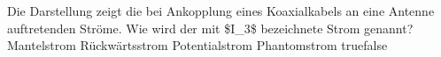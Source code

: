     {Die Darstellung zeigt die bei Ankopplung eines Koaxialkabels an eine Antenne auftretenden Ströme. Wie wird der mit \$I\_3\$ bezeichnete Strom genannt?}
    {Mantelstrom}
    {Rückwärtsstrom}
    {Potentialstrom}
    {Phantomstrom}
    {true}{false}